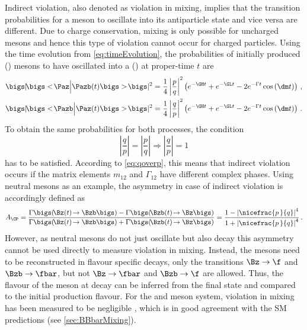 Indirect \CP violation, also denoted as \CP violation in mixing, implies that the transition probabilities for a meson \Paz to oscillate into its antiparticle state \Pazb and vice versa are different.
Due to charge conservation, mixing is only possible for uncharged mesons and hence this type of \CP violation cannot occur for charged particles.
Using the time evolution from \cref{eq:timeEvolution}, the probabilities of \eg initially produced \Paz (\Pazb) mesons to have oscillated into a \Pazb (\Paz) at proper-time $t$ are
\begin{align}
\bigs|\!\bigs<\!\Paz\Big|\Pazb\!\left(t\right)\!\bigs>\!\bigs|^2=\frac{1}{4}\left|\frac{p}{q}\right|^2
\left(e^{-\GH t}+e^{-\GL t}-2e^{-\Gamma t}\cos\left(\dm t\right)\right)\,,\\
\bigs|\!\bigs<\!\Pazb\Big|\Paz\!\left(t\right)\!\bigs>\!\bigs|^2=\frac{1}{4}\left|\frac{q}{p}\right|^2
\left(e^{-\GH t}+e^{-\GL t}-2e^{-\Gamma t}\cos\left(\dm t\right)\right)\,.
\end{align}
To obtain the same probabilities for both processes, the condition
\begin{equation}
\left|\frac{q}{p}\right|=\left|\frac{p}{q}\right| \Rightarrow \left|\frac{q}{p}\right|=1
\end{equation}
has to be satisfied.
According to \cref{eq:qoverp}, this means that indirect \CP violation occurs if the matrix elements $m_{12}$ and $\Gamma_{12}$ have different complex phases.
Using neutral \B mesons as an example, the \CP asymmetry in case of indirect \CP violation is accordingly defined as
\begin{equation}
A_{\CP}=\frac{\Gamma\bigs(\!\Bz(t)\!\to\Bzb\bigs) - \Gamma\bigs(\!\Bzb(t)\!\to\Bz\bigs)}{\Gamma\bigs(\!\Bz(t)\!\to\Bzb\bigs) + \Gamma\bigs(\!\Bzb(t)\!\to\Bz\bigs)}
= \frac{1-\left|\nicefrac{p\,}{q}\right|^4}{1+\left|\nicefrac{p\,}{q}\right|^4}\,.
\end{equation}
However, as neutral \B mesons do not just oscillate but also decay this asymmetry cannot be used directly to measure \CP violation in mixing.
Instead, the \B mesons need to be reconstructed in flavour specific decays, \ie only the transitions $\Bz\to\f$ and $\Bzb\to\fbar$, but not $\Bz\to\fbar$ and $\Bzb\to\f$ are allowed.
Thus, the flavour of the meson at decay can be inferred from the final state and compared to the initial production flavour.
For the \Bz and \Bs meson system, \CP violation in mixing has been measured to be negligible \cite{HFLAV2016}, which is in good agreement with the \ac{SM} predictions (see \cref{sec:BBbarMixing}).

